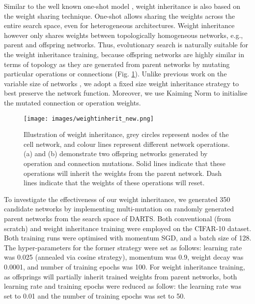 \documentclass[sigconf]{acmart}
\begin{document}
Similar to the well known one-shot model \cite{Ref:10,Ref:36}, weight inheritance is also based on the weight sharing technique.  One-shot allows sharing the weights across the entire search space, even for heterogeneous architectures.  Weight inheritance however only shares weights between topologically homogeneous networks, e.g., parent and offspring networks.  Thus, evolutionary search is naturally suitable for the weight inheritance training, because offspring networks are highly similar in terms of topology as they are generated from parent networks by mutating particular operations or connections (Fig. \ref{weightinherit}).  Unlike previous work on the variable size of networks \cite{Ref:55,Ref:36}, we adopt a fixed size weight inheritance strategy to best preserve the network function.  Moreover, we use Kaiming Norm \cite{Ref:56} to initialise the mutated connection or operation weights.

 \begin{figure}[!h]
    \begin{center}
  	\texttt{[image: images/weightinherit\_new.png]}
  	\caption{Illustration of weight inheritance, grey circles represent nodes of the cell network, and colour lines represent different network operations. (a) and (b) demonstrate two offspring networks generated by operation and connection mutations. Solid lines indicate that these operations will inherit the weights from the parent network.  Dash lines indicate that the weights of these operations will reset.}
  	\label{weightinherit}
  	\end{center}
\end{figure}

To investigate the effectiveness of our weight inheritance, we generated 350 candidate networks by implementing multi-mutation on randomly generated parent networks from the search space of DARTS. Both conventional (from scratch) and weight inheritance training were employed on the CIFAR-10 dataset.  Both training runs were optimised with momentum SGD, and a batch size of 128. 
The hyper-parameters for the former strategy were set as follows: learning rate was 0.025 (annealed via cosine strategy), momentum was 0.9, weight decay was 0.0001, and number of training epochs was 100. 
For weight inheritance training, as offsprings will partially inherit trained weights from parent networks, both learning rate and training epochs were reduced as follow: the learning rate was set to 0.01 and the number of training epochs was set to 50.
\end{document}
